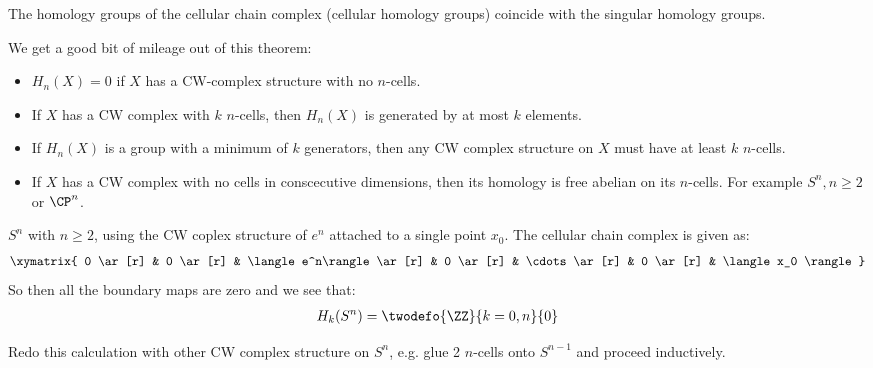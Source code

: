 \begin{theorem}\label{thm-cellular-homology-coincides}
	The homology groups of the cellular chain complex (cellular homology groups) coincide with the singular homology groups.
\end{theorem}

\begin{corollary}
	We get a good bit of mileage out of this theorem:
	\begin{itemize}
		\item $H_n(X) = 0$ if $X$ has a CW-complex structure with no $n$-cells.
		\item If $X$ has a CW complex with $k$ $n$-cells, then $H_n(X)$ is generated by at most $k$ elements.
		\item If $H_n(X)$ is a group with a minimum of $k$ generators, then any CW complex structure on $X$ must have at least $k$ $n$-cells.
		\item If $X$ has a CW complex with no cells in conscecutive dimensions, then its homology is free abelian on its $n$-cells. For example $S^n, n \geq 2$ or $\CP^n$.
	\end{itemize}
\end{corollary}

\begin{example}
	$S^n$ with $n \geq 2$, using the CW coplex structure of $e^n$ attached to a single point $x_0$. The cellular chain complex is given as:
	\begin{align*}
		\xymatrix{
		0 \ar[r] & 0 \ar[r] & \langle e^n\rangle \ar[r] & 0 \ar[r] & \cdots \ar[r] & 0 \ar[r] & \langle x_0 \rangle
		}
	\end{align*}
	So then all the boundary maps are zero and we see that:
	\begin{align*}
		H_k(S^n) = \twodefo{\ZZ}{k = 0, n}{0}
	\end{align*}
\end{example}

\begin{exercise}
	Redo this calculation with other CW complex structure on $S^n$, e.g. glue 2 $n$-cells onto $S^{n - 1}$ and proceed inductively.
\end{exercise}

